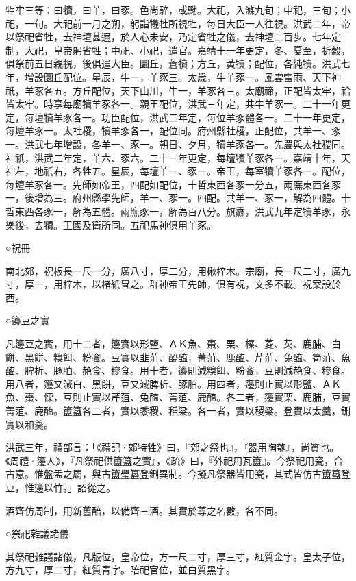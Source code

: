 牲牢三等：曰犢，曰羊，曰豕。色尚騂，或黝。大祀，入滌九旬；中祀，三旬；小祀，一旬。大祀前一月之朔，躬詣犧牲所視牲，每日大臣一人往視。洪武二年，帝以祭祀省牲，去神壇甚邇，於人心未安，乃定省牲之儀，去神壇二百步。七年定制，大祀，皇帝躬省牲；中祀、小祀，遣官。嘉靖十一年更定，冬、夏至，祈穀，俱祭前五日親視，後俱遣大臣。圜丘，蒼犢；方丘，黃犢；配位，各純犢。洪武七年，增設圜丘配位。星辰，牛一，羊豕三。太歲，牛羊豕一。風雲雷雨、天下神祇，羊豕各五。方丘配位，天下山川，牛一，羊豕各三。太廟禘，正配皆太牢，祫皆太牢。時享每廟犢羊豕各一。親王配位，洪武三年定，共牛羊豕一。二十一年更定，每壇犢羊豕各一。功臣配位，洪武二年定，每位羊豕體各一。二十一年更定，每壇羊豕一。太社稷，犢羊豕各一，配位同。府州縣社稷，正配位，共羊一、豕一。洪武七年增設，各羊一、豕一。朝日、夕月，犢羊豕各一。先農與太社稷同。神祇，洪武二年定，羊六、豕六。二十一年更定，每壇犢羊豕各一。嘉靖十年，天神左，地祇右，各牲五。星辰，每壇羊一、豕一。帝王，每室犢羊豕各一。配位，每壇羊豕各一。先師如帝王，四配如配位，十哲東西各豕一分五，兩廡東西各豕一，後增為三。府州縣學先師，羊一、豕一。四配。共羊一、豕一，解為四體。十哲東西各豕一，解為五體。兩廡豕一，解為百八分。旗纛，洪武九年定犢羊豕，永樂後，去犢。王國及衛所同。五祀馬神俱用羊豕。

○祝冊

南北郊，祝板長一尺一分，廣八寸，厚二分，用楸梓木。宗廟，長一尺二寸，廣九寸，厚一，用梓木，以楮紙冒之。群神帝王先師，俱有祝，文多不載。祝案設於西。

○籩豆之實

凡籩豆之實，用十二者，籩實以形鹽、ＡＫ魚、棗、栗、榛、菱、芡、鹿脯、白餅、黑餅、糗餌、粉餈。豆實以韭菹、醯醢，菁菹、鹿醢、芹菹、兔醢、筍菹、魚醢、脾析、豚胉、赩食、糝食。用十者，籩則減糗餌、粉餈，豆則減赩食、糝食。用八者，籩又減白、黑餅，豆又減脾析、豚胉。用四者，籩則止實以形鹽、ＡＫ魚、棗、慄，豆則止實以芹菹、兔醢、菁菹、鹿醢。各二者，籩實栗、鹿脯，豆實菁菹、鹿醢。簠簋各二者，實以黍稷、稻粱。各一者，實以稷粱。登實以太羹，鉶實以和羹。

洪武三年，禮部言：「《禮記·郊特牲》曰，『郊之祭也』，『器用陶匏』，尚質也。《周禮·籩人》，『凡祭祀供簠簋之實』，《疏》曰，『外祀用瓦簠』。今祭祀用瓷，合古意。惟盤盂之屬，與古簠璺簋登鉶異制。今擬凡祭器皆用瓷，其式皆仿古簠簋登豆，惟籩以竹。」詔從之。

酒齊仿周制，用新舊醅，以備齊三酒。其實於尊之名數，各不同。

○祭祀雜議諸儀

其祭祀雜議諸儀，凡版位，皇帝位，方一尺二寸，厚三寸，紅質金字。皇太子位，方九寸，厚二寸，紅質青字。陪祀官位，並白質黑字。


